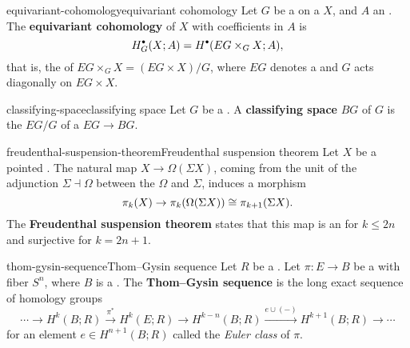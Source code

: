 \begin{topic}{equivariant-cohomology}{equivariant cohomology}
    Let $G$ be a   on a  $X$, and $A$ an . The \textbf{equivariant cohomology} of $X$ with coefficients in $A$ is
    \[ H_G^\bdot(X; A) = H^\bdot(EG \times_G X; A), \]
    that is, the  of $EG \times_G X = (EG \times X) / G$, where $EG$ denotes a  and $G$ acts diagonally on $EG \times X$.
\end{topic}

\begin{topic}{classifying-space}{classifying space}
    Let $G$ be a . A \textbf{classifying space} $BG$ of $G$ is the  $EG/G$ of a  $EG \to BG$.
\end{topic}

\begin{topic}{freudenthal-suspension-theorem}{Freudenthal suspension theorem}
    Let $X$ be a pointed  . The natural map $X \to \Omega (\Sigma X)$, coming from the unit of the adjunction $\Sigma \dashv \Omega$ between the  $\Omega$ and  $\Sigma$, induces a morphism
    \[ \pi_k(X) \to \pi_k(\Omega(\Sigma X)) \cong \pi_{k + 1}(\Sigma X) . \]
    The \textbf{Freudenthal suspension theorem} states that this map is an  for $k \le 2n$ and surjective for $k = 2n + 1$.
\end{topic}

\begin{topic}{thom-gysin-sequence}{Thom--Gysin sequence}
    Let $R$ be a . Let $\pi : E \to B$ be a   with fiber $S^n$, where $B$ is a  . The \textbf{Thom--Gysin sequence} is the long exact sequence of homology groups
    \[ \cdots \to H^k(B; R) \xrightarrow{\pi^*} H^k(E; R) \to H^{k - n}(B; R) \xrightarrow{e \cup (-)} H^{k + 1}(B; R) \to \cdots \]
    for an element $e \in H^{n + 1}(B; R)$ called the \textit{Euler class} of $\pi$.
\end{topic}
